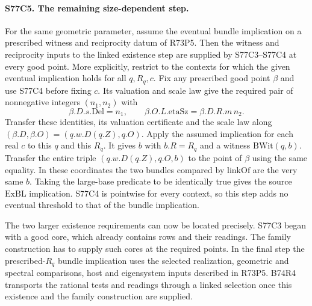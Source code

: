 \paragraph{S77C5. The remaining size-dependent step.}
For the same geometric parameter, assume the eventual bundle
implication on a prescribed witness and reciprocity datum of R73P5.
Then the witness and reciprocity inputs to the linked existence
step are supplied by S77C3--S77C4 at every good point. More
explicitly, restrict to the contexts for which the given eventual
implication holds for all $q,R_q,c$. Fix any prescribed good point
$\beta$ and use S77C4 before fixing $c$. Its valuation and scale
law give the required pair of nonnegative integers $(n_1,n_2)$ with
\[
 \beta.D.s.\mathrm{Del}=n_1,\qquad
 \beta.O.L.\mathrm{etaSz}=\beta.D.R.m\,n_2 .
\]
Transfer these identities, its valuation certificate and the scale
law along $(\beta.D,\beta.O)=(q.w.D(q.Z),q.O)$. Apply the
assumed implication for each real $c$ to this $q$ and this $R_q$.
It gives $b$ with $b.R=R_q$ and a witness $\mathrm{BWit}(q,b)$.
Transfer the entire triple $(q.w.D(q.Z),q.O,b)$ to the point of
$\beta$ using the same equality. In these coordinates the two
bundles compared by $\mathrm{linkOf}$ are the very same $b$.
Taking the large-base predicate to be identically true gives the
source $\mathrm{ExBL}$ implication. S77C4 is pointwise for every
context, so this step adds no eventual threshold to that of the
bundle implication.

The two larger existence requirements can now be located precisely.
S77C3 began with a good core, which already contains rows and their
readings. The family construction has to supply such cores at the
required points. In the final step the prescribed-$R_q$ bundle
implication uses the selected realization, geometric and spectral
comparisons, host and eigensystem inputs described in R73P5. B74R4
transports the rational tests and readings through a linked selection
once this existence and the family construction are supplied.
